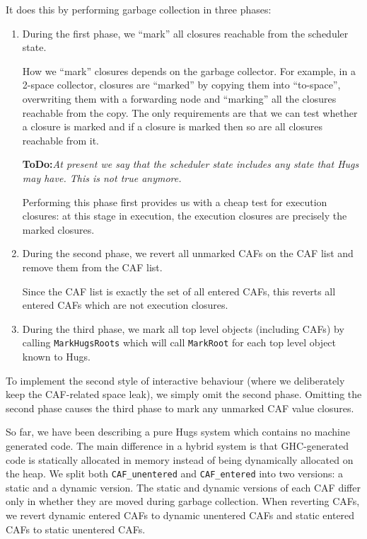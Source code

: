 \documentclass[11pt]{article}
\newcommand{\ToDo}[1]{{{\bf ToDo:}\sl #1}}
\begin{document}
It does this by performing garbage collection in three phases:
\begin{enumerate}
\item
During the first phase, we ``mark'' all closures reachable from the
scheduler state.  

How we ``mark'' closures depends on the garbage collector.  For
example, in a 2-space collector, closures are ``marked'' by copying
them into ``to-space'', overwriting them with a forwarding node and
``marking'' all the closures reachable from the copy.  The only
requirements are that we can test whether a closure is marked and if a
closure is marked then so are all closures reachable from it.

\ToDo{At present we say that the scheduler state includes any state
that Hugs may have.  This is not true anymore.}

Performing this phase first provides us with a cheap test for
execution closures: at this stage in execution, the execution closures
are precisely the marked closures.

\item
During the second phase, we revert all unmarked CAFs on the CAF list
and remove them from the CAF list.

Since the CAF list is exactly the set of all entered CAFs, this reverts
all entered CAFs which are not execution closures.

\item
During the third phase, we mark all top level objects (including CAFs)
by calling \verb+MarkHugsRoots+ which will call \verb+MarkRoot+ for
each top level object known to Hugs.

\end{enumerate}

To implement the second style of interactive behaviour (where we
deliberately keep the CAF-related space leak), we simply omit the
second phase.  Omitting the second phase causes the third phase to
mark any unmarked CAF value closures.

So far, we have been describing a pure Hugs system which contains no
machine generated code.  The main difference in a hybrid system is
that GHC-generated code is statically allocated in memory instead of
being dynamically allocated on the heap.  We split both
\verb+CAF_unentered+ and \verb+CAF_entered+ into two versions: a
static and a dynamic version.  The static and dynamic versions of each
CAF differ only in whether they are moved during garbage collection.
When reverting CAFs, we revert dynamic entered CAFs to dynamic
unentered CAFs and static entered CAFs to static unentered CAFs.
\end{document}
